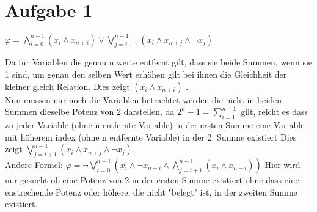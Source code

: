 \section*{Aufgabe 1}


$\varphi = \bigwedge_{i=0}^{n-1}(x_i \wedge x_{n+i}) \vee \bigvee_{j=i+1}^{n-1}( x_i \wedge x_{n+j} \wedge \neg x_{j})$ 



Da für Variablen die genau n werte entfernt gilt, dass sie beide Summen, wenn sie 1 sind, um genau den selben Wert erhöhen gilt bei ihnen die Gleichheit der kleiner gleich Relation. Dies zeigt $(x_i \wedge x_{n+i})$ .\\


Nun müssen nur noch die Variablen betrachtet werden die nicht in beiden Summen dieselbe Potenz von 2 darstellen, da $2^n-1 = \sum_{i=1}^{n-1}$ gilt, reicht es dass zu jeder Variable (ohne n entfernte Variable) in der ersten Summe eine Variable mit höherem index (ohne n entfernte Variable) in der 2. Summe  existiert
Dies zeigt $ \bigvee_{j=i+1}^{n-1}( x_i \wedge x_{n+j} \wedge \neg x_{j})$. \\



Andere Formel: $ \varphi = \neg \bigvee_{i=0}^{n-1}(x_i \wedge \neg x_{n+i} \wedge \bigwedge_{j=i+1}^{n-1} (x_i \wedge x_{n+i}))$ 
Hier wird nur gesucht ob eine Potenz von 2 in der ersten Summe existiert ohne dass eine enstrechende Potenz oder höhere, die nicht "belegt" ist, in der zweiten Summe existiert.